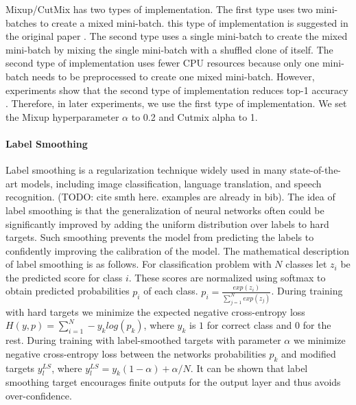 Mixup/CutMix has two types of implementation. The first type uses two mini-batches to create a mixed mini-batch. this type of implementation is suggested in the original paper \cite{zhang2017_mixup}. The second type uses a single mini-batch to create the mixed mini-batch by mixing the single mini-batch with a shuffled clone of itself. The second type of implementation uses fewer CPU resources because only one mini-batch needs to be preprocessed to create one mixed mini-batch. However, experiments show that the second type of implementation reduces top-1 accuracy \cite{lee2020_compounding_improvements}. Therefore, in later experiments, we use the first type of implementation. We set the Mixup hyperparameter $\alpha$ to 0.2 and Cutmix alpha to 1. 




\paragraph{Label Smoothing}

Label smoothing is a regularization technique widely used in many state-of-the-art models, including image classification, language translation, and speech recognition. (TODO: cite smth here. examples are already in bib). The idea of label smoothing is that the generalization of neural networks often could be significantly improved by adding the uniform distribution over labels to hard targets. Such smoothing prevents the model from predicting the labels to confidently improving the calibration of the model.  The mathematical description of label smoothing is as follows. For classification problem with $N$ classes let $z_i$ be the predicted score for class $i$. These scores are normalized using softmax to obtain predicted probabilities $p_i$ of each class. $p_i = \frac{exp(z_i)}{\sum_{j=1}^N exp(z_j)} $. During training with hard targets we minimize the expected negative cross-entropy loss $H(y, p) = \sum_{i=1}^N -y_k log(p_k)$, where $y_k$ is $1$ for correct class and $0$ for the rest. During training with label-smoothed targets with parameter $\alpha$ we minimize negative cross-entropy loss between the networks probabilities $p_k$ and modified targets  $y_l^{LS}$, where $y_l^{LS} = y_k (1 - \alpha ) + \alpha / N$. It can be shown \cite{he2019_bag_of_tricks} that label smoothing target encourages finite outputs for the output layer and thus avoids over-confidence.


